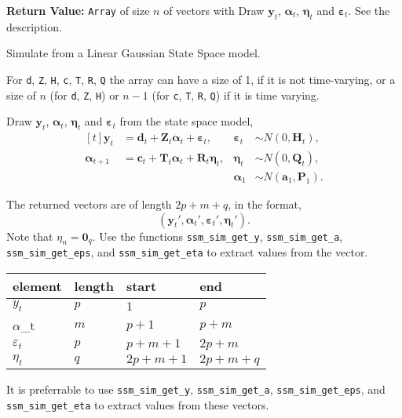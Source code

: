 \documentclass[]{book}
\newcommand{\mat}[1]{\boldsymbol{#1}}
\renewcommand{\vec}[1]{\boldsymbol{#1}}
\begin{document}
\textbf{Return Value:} \texttt{Array} of size \(n\) of vectors with Draw
\(\vec{y}_t\), \(\vec{\alpha}_t\), \(\vec{\eta}_t\) and
\(\vec{\varepsilon}_t\). See the description.

Simulate from a Linear Gaussian State Space model.

For \texttt{d}, \texttt{Z}, \texttt{H}, \texttt{c}, \texttt{T},
\texttt{R}, \texttt{Q} the array can have a size of 1, if it is not
time-varying, or a size of \(n\) (for \texttt{d}, \texttt{Z},
\texttt{H}) or \(n - 1\) (for \texttt{c}, \texttt{T}, \texttt{R},
\texttt{Q}) if it is time varying.

Draw \(\vec{y}_t\), \(\vec{\alpha}_t\), \(\vec{\eta}_t\) and
\(\vec{\varepsilon}_t\) from the state space model, \[
\begin{aligned}[t]
\vec{y}_t &= \vec{d}_t + \mat{Z}_t \vec{\alpha}_t + \vec{\varepsilon}_t,  &
\vec{\varepsilon}_t & \sim N(0, \mat{H}_t), \\
\vec{\alpha}_{t + 1} &= \vec{c}_t + \mat{T}_t \vec{\alpha}_t + \mat{R}_t \vec{\eta}_t,  &
\vec{\eta}_t & \sim N(0, \mat{Q}_t), \\
&& \vec{\alpha}_1 &\sim N(\vec{a}_1, \mat{P}_1) .
\end{aligned}
\]

The returned vectors are of length \(2 p + m + q\), in the format, \[
(\vec{y}_t', \vec{\alpha}_t', \vec{\varepsilon}_t', \vec{\eta}_t') .
\] Note that \(\eta_n = \vec{0}_q\). Use the functions
\texttt{ssm\_sim\_get\_y}, \texttt{ssm\_sim\_get\_a},
\texttt{ssm\_sim\_get\_eps}, and \texttt{ssm\_sim\_get\_eta} to extract
values from the vector.

\begin{longtable}[c]{@{}llll@{}}
\toprule
element & length & start & end\tabularnewline
\midrule
\endhead
\(y_t\) & \(p\) & \(1\) & \(p\)\tabularnewline
\(\alpha\)\_t & \(m\) & \(p + 1\) & \(p + m\)\tabularnewline
\(\varepsilon_t\) & \(p\) & \(p + m + 1\) & \(2 p + m\)\tabularnewline
\(\eta_t\) & \(q\) & \(2 p + m + 1\) & \(2 p + m + q\)\tabularnewline
\bottomrule
\end{longtable}

It is preferrable to use \texttt{ssm\_sim\_get\_y},
\texttt{ssm\_sim\_get\_a}, \texttt{ssm\_sim\_get\_eps}, and
\texttt{ssm\_sim\_get\_eta} to extract values from these vectors.
\end{document}
